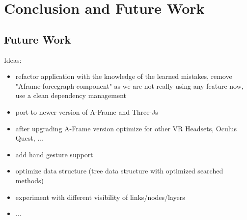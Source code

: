 \chapter{Conclusion and Future Work}

\section{Future Work}
Ideas:
\begin{itemize}
    \item refactor application with the knowledge of the learned mistakes, remove "Aframe-forcegraph-component" as we are not really using any feature now, use a clean dependency management
    \item port to newer version of A-Frame and Three-Js
    \item after upgrading A-Frame version optimize for other VR Headsets, Oculus Quest, ... 
    \item add hand gesture support
    \item optimize data structure (tree data structure  with optimized searched methods)
    \item experiment with different visibility of links/nodes/layers
    \item ...
\end{itemize}